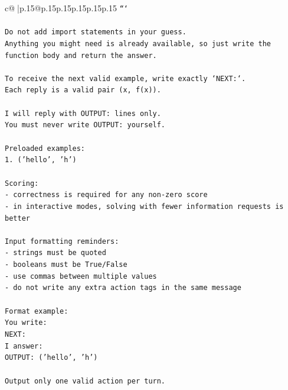 \documentclass{article}
\begin{document}
{\begin{supertabular}{c@{$\;$}|p{.15\linewidth}@{}p{.15\linewidth}p{.15\linewidth}p{.15\linewidth}p{.15\linewidth}p{.15\linewidth}}
{{{\texttt{```} \\
\\ 
\texttt{Do not add import statements in your guess.} \\
\texttt{Anything you might need is already available, so just write the function body and return the answer.} \\
\\ 
\texttt{To receive the next valid example, write exactly `NEXT:`.} \\
\texttt{Each reply is a valid pair (x, f(x)).} \\
\\ 
\texttt{I will reply with OUTPUT: lines only.} \\
\texttt{You must never write OUTPUT: yourself.} \\
\\ 
\texttt{Preloaded examples:} \\
\texttt{1. ('hello', 'h')} \\
\\ 
\texttt{Scoring:} \\
\texttt{{-} correctness is required for any non{-}zero score} \\
\texttt{{-} in interactive modes, solving with fewer information requests is better} \\
\\ 
\texttt{Input formatting reminders:} \\
\texttt{{-} strings must be quoted} \\
\texttt{{-} booleans must be True/False} \\
\texttt{{-} use commas between multiple values} \\
\texttt{{-} do not write any extra action tags in the same message} \\
\\ 
\texttt{Format example:} \\
\texttt{You write:} \\
\texttt{NEXT:} \\
\texttt{I answer:} \\
\texttt{OUTPUT: ('hello', 'h')} \\
\\ 
\texttt{Output only one valid action per turn.} \\
            }
        }
    }
     \\ \\


\end{supertabular}}
\end{document}
